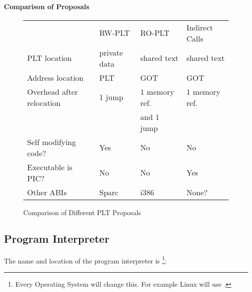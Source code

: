 
\paragraph{Comparison of Proposals}

\begin{figure}
\caption{Comparison of Different PLT Proposals}

\begin{center}
\begin{tabular}{llll}
    \hline\noalign{\smallskip}
&RW-PLT & RO-PLT & Indirect Calls \\
    \noalign{\smallskip}\hline\noalign{\smallskip}
PLT location & private data & shared text & shared text \\
Address location & PLT & GOT & GOT \\
Overhead after relocation & 1 jump & 1 memory ref. & 1 memory ref.\\
&&and 1 jump &  \\
Self modifying code? & Yes &  No & No\\
Executable is PIC? & No & No & Yes \\
Other ABIs & Sparc & i386 & None? \\
\end{tabular}
\end{center}
\end{figure}
                                

\subsection{Program Interpreter}

The name and location of the program interpreter  is%
\footnote{Every Operating System will change this.
  For example Linux will use .}:

\bigskip
{}

